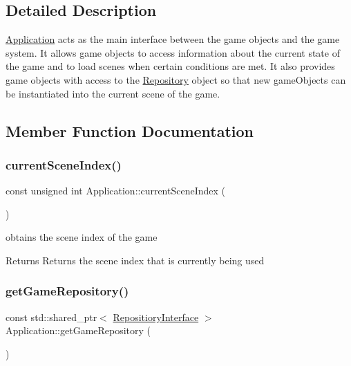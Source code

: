 \subsection{Detailed Description}
\hyperlink{class_application}{Application} acts as the main interface between the game objects and the game system. It allows game objects to access information about the current state of the game and to load scenes when certain conditions are met. It also provides game objects with access to the \hyperlink{class_repository}{Repository} object so that new game\+Objects can be instantiated into the current scene of the game. 

\subsection{Member Function Documentation}
\mbox{\label{class_application_aaad856399fbe63c7f14a95fc59d0111f}} 
\subsubsection{\texorpdfstring{current\+Scene\+Index()}{currentSceneIndex()}}
{\footnotesize\ttfamily const unsigned int Application\+::current\+Scene\+Index (\begin{DoxyParamCaption}{ }\end{DoxyParamCaption})\hspace{0.3cm}{\ttfamily [static]}}



obtains the scene index of the game 

\begin{DoxyReturn}{Returns}
Returns the scene index that is currently being used 
\end{DoxyReturn}
\mbox{\label{class_application_aa895ae75cdb47ab91584c32b0db0ca06}} 
\subsubsection{\texorpdfstring{get\+Game\+Repository()}{getGameRepository()}}
{\footnotesize\ttfamily const std\+::shared\+\_\+ptr$<$ \hyperlink{class_repositiory_interface}{Repositiory\+Interface} $>$ Application\+::get\+Game\+Repository (\begin{DoxyParamCaption}{ }\end{DoxyParamCaption})\hspace{0.3cm}{\ttfamily [static]}}



